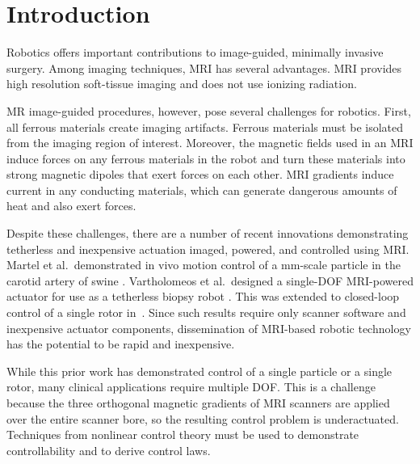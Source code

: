 \section{Introduction}\label{sec:Intro}

Robotics offers important contributions to image-guided, minimally invasive surgery.  
Among imaging techniques,  MRI has several advantages.  MRI provides high resolution soft-tissue imaging and does not use ionizing radiation. 
%


 MR image-guided procedures, however, pose several challenges for robotics\cite{Ho2012TRO,fischer2008mri,Martel2007,vartholomeos2011mripowered,vartholomeos2013mri}.  First, all ferrous materials create imaging artifacts.  Ferrous materials must be isolated from the imaging region of interest.  Moreover, the magnetic fields used in an MRI induce forces on any ferrous materials in the robot and turn these materials into strong magnetic dipoles that exert forces on each other.   MRI gradients induce current in any conducting materials, which can generate dangerous amounts of heat and also exert forces. 
 
Despite these challenges, there are a number of recent innovations demonstrating tetherless and inexpensive actuation imaged, powered, and controlled using MRI.   Martel et al.\ demonstrated in vivo motion control of a mm-scale particle in the carotid artery of swine \cite{Martel2007}. Vartholomeos et al.~designed a single-DOF MRI-powered actuator for use as a tetherless biopsy robot \cite{vartholomeos2011mripowered}.  This was extended to closed-loop control of a single rotor in~\cite{vartholomeos2013mri}. Since such results require only scanner software and inexpensive actuator components, dissemination of MRI-based robotic technology has the potential to be rapid and inexpensive.

While this prior work has demonstrated control of a single particle or a single rotor, many clinical applications require multiple DOF. This is a challenge because the three orthogonal magnetic gradients of MRI scanners are applied over the entire scanner bore, so the resulting control problem is underactuated. Techniques from nonlinear control theory must be used to demonstrate controllability and to derive control laws.

